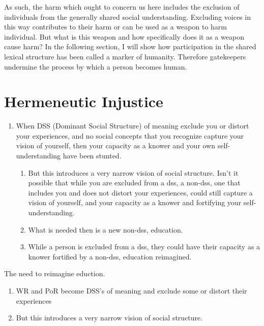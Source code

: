 \documentclass[
  letterpaper,
  DIV=11,
  numbers=noendperiod]{scrreprt}
\providecommand{\tightlist}{%
  \setlength{\itemsep}{0pt}\setlength{\parskip}{0pt}}\usepackage{longtable,booktabs,array}
\begin{document}
\begin{tcolorbox}[enhanced jigsaw, arc=.35mm, breakable, rightrule=.15mm, colback=white, colframe=quarto-callout-important-color-frame, bottomrule=.15mm, leftrule=.75mm, opacityback=0, toprule=.15mm, left=2mm]
\begin{tcolorbox}[enhanced jigsaw, arc=.35mm, breakable, rightrule=.15mm, colback=white, colframe=quarto-callout-tip-color-frame, bottomrule=.15mm, leftrule=.75mm, opacityback=0, toprule=.15mm, left=2mm]
As such, the harm which ought to concern us here includes the exclusion
of individuals from the generally shared social understanding. Excluding
voices in this way contributes to their harm or can be used as a weapon
to harm individual. But what is this weapon and how specifically does it
as a weapon cause harm? In the following section, I will show how
participation in the shared lexical structure has been called a marker
of humanity. Therefore gatekeepers undermine the process by which a
person becomes human.

\section{Hermeneutic Injustice}\label{hermeneutic-injustice}

\begin{enumerate}
\def\labelenumi{\arabic{enumi}.}
\tightlist
\item
  When DSS (Dominant Social Structure) of meaning exclude you or distort
  your experiences, and no social concepts that you recognize capture
  your vision of yourself, then your capacity as a knower and your own
  self-understanding have been stunted.

  \begin{enumerate}
  \def\labelenumii{\arabic{enumii}.}
  \tightlist
  \item
    But this introduces a very narrow vision of social structure. Isn't
    it possible that while you are excluded from a dss, a non-dss, one
    that includes you and does not distort your experiences, could still
    capture a vision of yourself, and your capacity as a knower and
    fortifying your self-understanding.
  \item
    What is needed then is a new non-dss, education.
  \item
    While a person is excluded from a dss, they could have their
    capacity as a knower fortified by a non-dss, education reimagined.
  \end{enumerate}
\end{enumerate}

The need to reimagine eduction.

\begin{enumerate}
\def\labelenumi{\arabic{enumi}.}
\tightlist
\item
  WR and PoR become DSS's of meaning and exclude some or distort their
  experiences
\item
  But this introduces a very narrow vision of social structure.


\end{enumerate}
\end{tcolorbox}
\end{tcolorbox}
\end{document}
